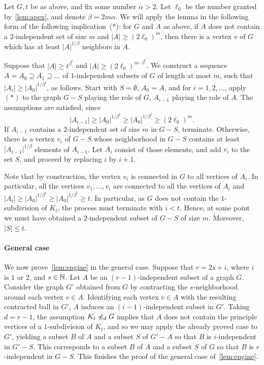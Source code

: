 Let $G,t$ be as above, and fix some number $\alpha>2$. Let $\ell_0$ be the number granted by~\cref{lem:apex}, and denote $\beta= 2m\alpha$.
We will apply the lemma in the following form of the following implication~($\ast$):
for $G$ and $A$  as above, if $A$ does not contain a $2$-independent set of size $m$ and $|A|\ge (2\ell_0)^m$, then there is a vertex $v$ of $G$ which has
at least $|A|^{1/\beta}$ neighbors in $A$.


Suppose that $|A|\ge t^{\beta^t}$ and $|A|\ge (2\ell_0)^{m\cdot \beta^t}$.
We construct a sequence  $A=A_0\supseteq A_1\supseteq\ldots$ 
of $1$-independent subsets of $G$
of length at most $m$,
such that $|A_i|\ge |A_0|^{1/\beta^i}$,
 as follows. Start with $S=\emptyset$, $A_0=A$, and 
for $i=1,2,\ldots$,
 apply~$(\ast)$ to the graph $G-S$ playing the role of $G$, 
 $A_{i-1}$ playing the role of $A$.
The assumptions are satisfied, since $$|A_{i-1}|\ge 
|A_0|^{1/\beta^i}\ge |A_0|^{1/\beta^t}\ge (2\ell_0)^m.$$
If $A_{i-1}$ contains a $2$-independent set of size $m$ in $G-S$, terminate.
 Otherwise, there is a vertex $v_i$ of $G-S$
 whose neighborhood in $G-S$ contains at least
 $|A_{i-1}|^{1/\beta}$ elements of $A_{i-1}$.
 Let $A_{i}$ consist of those elements, and add $v_i$
 to the set $S$, and proceed by replacing $i$ by $i+1$.
 
 Note that by construction, the vertex $v_i$ is connected in $G$
 to all vertices of $A_{i}$. In particular, all the vertices $v_1,\ldots,v_i$ are connected to all the vertices of $A_{i}$
 and $|A_i|\ge |A_0|^{1/\beta^i}\ge |A_0|^{1/\beta^t}\ge t$. In particular, as $G$
 does not contain the $1$-subdivision of $K_t$,
 the process must terminate with $i<t$.
 Hence, at some point we must have obtained a $2$-independent subset of $G-S$ of size $m$.
 Moreover, $|S|\le t$.


\paragraph{General case}
We now prove~\cref{lem:engine} in the general case.
Suppose that $r=2s+i$, where $i$ is $1$ or $2$, and $s\in\mathbb{N}$. Let $A$ be an $(r-1)$-independent subset of a graph $G$. Consider the graph $G'$ obtained from $G$
by contracting the $s$-neighborhood around each vertex $v\in A$. Identifying each vertex $v\in A$ with the resulting contracted ball in $G'$,  $A$ induces an $(i-1)$-independent subset in $G'$. 
Taking $d=r-1$, the assumption $K_t\not\preccurlyeq_d G$
implies that $A$ does not contain the principle vertices of a $1$-subdivision of $K_t$, and so we may apply the already proved case to $G'$, yielding a subset $B$ of $A$ and a subset $S$ of $G'-A$
so that $B$ is $i$-independent in $G'-S$. 
This corresponds to a subset $B$ of $A$ and a subset $S$ of $G$
so that $B$ is $r$-independent in $G-S$.
This finishes  the proof of the general case of~\cref{lem:engine}.



